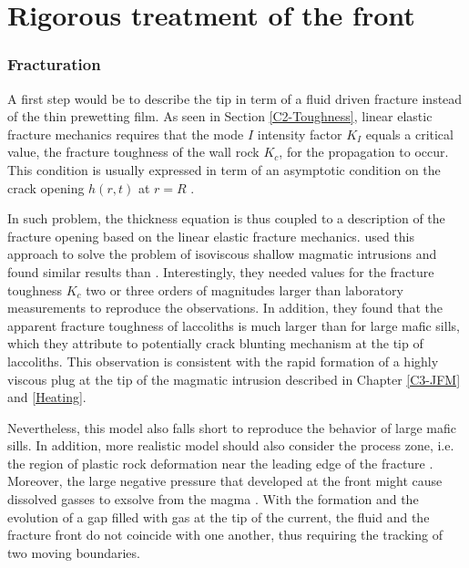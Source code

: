 \section{Rigorous treatment of the front}
\label{sec:rigor-treatm-front}

\subsubsection*{Fracturation}
\label{sec:fracturation}

A first step  would be to describe  the tip in term of  a fluid driven
fracture  instead of  the thin  prewetting  film. As  seen in  Section
\ref{C2-Toughness},  linear elastic  fracture mechanics  requires that
the  mode $I$  intensity factor  $K_I$  equals a  critical value,  the
fracture toughness  of the wall  rock $K_{c}$, for the  propagation to
occur. This  condition is usually  expressed in term of  an asymptotic
condition    on    the    crack     opening    $h(r,t)$    at    $r=R$
\citep{Savitski:2002gy,Bunger:2005em,Bunger:2007vs,Detournay:2014fk}.

In  such  problem,  the  thickness  equation  is  thus  coupled  to  a
description  of  the fracture  opening  based  on the  linear  elastic
fracture mechanics. \citet{Bunger:2011cb} used  this approach to solve
the  problem  of  isoviscous  shallow magmatic  intrusions  and  found
similar  results  than   \citet{Michaut:2011kg}.  Interestingly,  they
needed values for the fracture toughness  $K_c$ two or three orders of
magnitudes  larger  than  laboratory  measurements  to  reproduce  the
observations.  In  addition, they  found  that  the apparent  fracture
toughness of  laccoliths is  much larger than  for large  mafic sills,
which they  attribute to potentially  crack blunting mechanism  at the
tip  of laccoliths.  This  observation is  consistent  with the  rapid
formation  of  a highly  viscous  plug  at  the  tip of  the  magmatic
intrusion described in Chapter \ref{C3-JFM} and \ref{Heating}.

Nevertheless, this model also falls short to reproduce the behavior of
large  mafic sills.   In addition,  more realistic  model should  also
consider the process zone, i.e. the region of plastic rock deformation
near the leading edge of the fracture \citep{Bunger:2008cl}. Moreover,
the large  negative pressure that  developed at the front  might cause
dissolved gasses to exsolve from the magma \citep{Lister:2013ia}. With
the formation and the evolution of a gap filled with gas at the tip of
the current, the fluid and the fracture front do not coincide with one
another, thus requiring the tracking of two moving boundaries.

